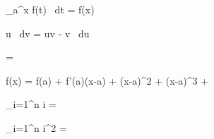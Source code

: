 
 \int_a^x f(t) \, dt = f(x)

\int u \, dv = uv - \int v \, du

 =  \cdot {}

f(x) = f(a) + f'(a)(x-a) + (x-a)^2 + (x-a)^3 + \cdots

\sum_{i=1}^{n} i = 

\sum_{i=1}^{n} i^2 = 
